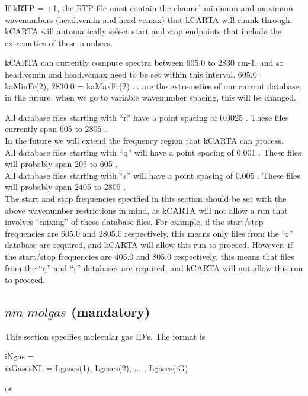 \documentclass[12pt]{article}
\newcommand{\kc}{\textsf{kCARTA}\xspace}
\newcommand{\ttab}{\indent\indent}
\begin{document}
If kRTP = +1, the RTP file must contain the channel minimum and maximum 
wavenumbers (head.vcmin and head.vcmax) that \kc will chunk through. \kc will 
automatically select start and stop endpoints that include the extremeties of 
these numbers.

\kc can currently compute spectra between 605.0 to 2830 cm-1, and so 
head.vcmin and head.vcmax need to be set within this interval. 
605.0 = kaMinFr(2),  2830.0 = kaMaxFr(2) ... are the extremeties of our 
current database; in the future, when we go to variable wavenumber spacing, 
this will be changed. 

All database files starting with ``r'' have a point spacing of 0.0025 \wn.
These files currently span 605 to 2805 \wn.\\

In the future we will extend the frequency region that kCARTA can process.\\
All database files starting with ``q'' will have a point spacing of 0.001 \wn.
These files will probably span 205 to 605 \wn.\\
All database files starting with ``s'' will have a point spacing of 0.005 \wn.
These files will probably span 2405 to 2805 \wn.\\

The start and stop frequencies specified in this section should be set 
with the above wavenumber restrictions in mind, as kCARTA will not allow a run
that involves ``mixing'' of these database files. For example, if the 
start/stop frequencies are 605.0 and 2805.0 respectively, this means only files
from the ``r'' database are required, and kCARTA will allow this run to 
proceed. However, if the 
start/stop frequencies are 405.0 and 805.0 respectively, this means that files
from the ``q'' and ``r'' databases are required, and kCARTA will not allow 
this run to proceed. 

\subsection{$nm\_molgas$ (mandatory)}

This section specifies molecular gas ID's.  The format is

\smallskip
{\sf
\ttab iNgas = \\
\ttab iaGasesNL = Lgases(1), Lgases(2), ...  , Lgases(iG)
}

\smallskip
\noindent or

\smallskip
{\sf
\ttab{\sf iNgas = -1}
}
\end{document}
